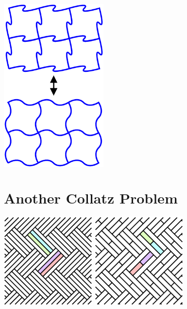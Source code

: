 \documentclass{beamer}
\begin{document}
\begin{frame}
  \begin{center}
    \includegraphics[height=3.5in]{equiv-equiv-alt}
  \end{center}
\end{frame}


\section{Another Collatz Problem}

\begin{frame}
  \begin{center}
    \includegraphics[width=1.9in]{c01}
    \includegraphics[width=1.9in]{c12}
  \end{center}
\end{frame}
\end{document}

